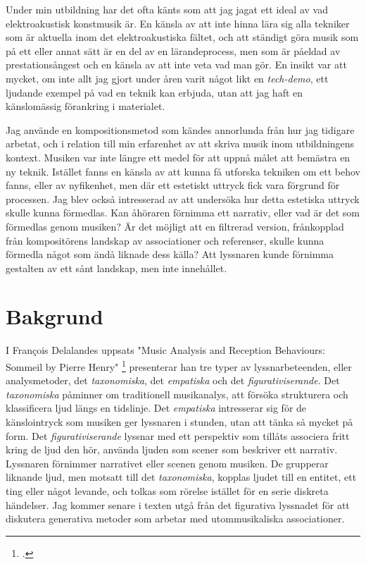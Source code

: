 \documentclass{article}
\begin{document}
Under min utbildning har det ofta känts som att jag jagat ett ideal av vad elektroakustisk konstmusik är. En
känsla av att inte hinna lära sig alla tekniker som är aktuella inom det elektroakustiska fältet, och att
ständigt göra musik som på ett eller annat sätt är en del av en lärandeprocess, men som är påeldad av
prestationsångest och en känsla av att inte veta vad man gör. En insikt var att mycket, om inte allt jag gjort
under åren varit något likt en \emph{tech-demo}, ett ljudande exempel på vad en teknik kan erbjuda, utan att jag
haft en känslomässig förankring i materialet.

Jag använde en kompositionsmetod som kändes annorlunda från hur jag tidigare arbetat, och i relation till min
erfarenhet av att skriva musik inom utbildningens kontext. 
% 
Musiken var inte längre ett medel för att uppnå målet att bemästra en ny teknik. Istället fanns en känsla av
att kunna få utforska tekniken om ett behov fanns, eller av nyfikenhet, men där ett estetiskt uttryck fick
vara förgrund för processen.
Jag blev också intresserad av att undersöka hur detta estetiska uttryck skulle kunna förmedlas. Kan åhöraren
förnimma ett narrativ, eller vad är det som förmedlas genom musiken? Är det möjligt att en filtrerad version,
frånkopplad från kompositörens landskap av associationer och referenser, skulle kunna förmedla något som ändå
liknade dess källa? Att lyssnaren kunde förnimma gestalten av ett sånt landskap, men inte innehållet.



\pagebreak
\section{Bakgrund}

I François Delalandes uppsats "Music Analysis and Reception Behaviours: Sommeil by Pierre Henry"
\footcite[26, 38, 52]{Delalande1998} presenterar han tre typer av lyssnarbeteenden, eller analysmetoder, det
\emph{taxonomiska}, det \emph{empatiska} och det \emph{figurativiserande}. Det \emph{taxonomiska} påminner om
traditionell musikanalys, att försöka strukturera och klassificera ljud längs en tidslinje. Det
\emph{empatiska} intresserar sig för de känslointryck som musiken ger lyssnaren i stunden, utan att tänka så mycket på
form. Det \emph{figurativiserande} lyssnar med ett perspektiv som tillåts associera fritt kring de
ljud den hör, använda ljuden som scener som beskriver ett narrativ. Lyssnaren förnimmer narrativet eller
scenen genom musiken. De grupperar liknande ljud, men motsatt till det \emph{taxonomiska}, kopplas ljudet till
en entitet, ett ting eller något levande, och tolkas som rörelse istället för en serie diskreta händelser. Jag
kommer senare i texten utgå från det figurativa lyssnadet för att diskutera generativa metoder som arbetar med
utommusikaliska associationer. 
\end{document}
